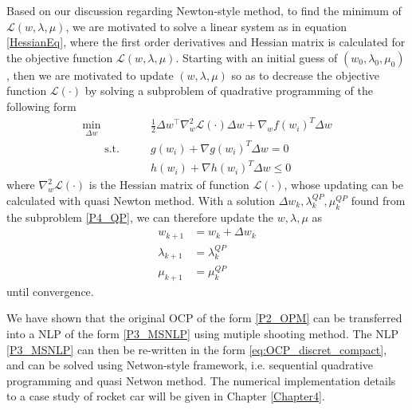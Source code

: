 \documentclass  [
  paper    = a4,
  BCOR     = 10mm,
  twoside,
  fontsize = 12pt,
  fleqn,
  toc      = bibnumbered,
  toc      = listofnumbered,
  numbers  = noendperiod,
  headings = normal,
  listof   = leveldown,
  version  = 3.03
]                                       {scrreprt}
\newcommand{\<}{\langle}
\renewcommand{\>}{\rangle}
\begin{document}
Based on our discussion regarding Newton-style method, to find the minimum of $	\mathcal{L}(w,\lambda, \mu) $, we are motivated to solve a linear system as in equation \ref{HessianEq}, where the first order derivatives and Hessian matrix is calculated for the objective function $\mathcal{L}(w,\lambda, \mu)$. Starting with an initial guess of $(w_0, \lambda_0, \mu_0)$, then we are motivated to update  $(w,\lambda, \mu)$ so as to decrease the objective function $\mathcal{L}(\cdot)$ by solving a subproblem of quadrative programming of the following form
\begin{subequations}
	\label{eq:ocp_QP}
	\begin{align}
		\underset{\Delta w }{\text{min}} \qquad & \frac{1}{2} \Delta w^\top \nabla^2_w \mathcal{L}(\cdot)\Delta w +\nabla_w f(w_i)^T \Delta w	\\
		\qquad \text{s.t.}\qquad	& g(w_i) + \nabla g(w_i)^T \Delta w = 0 \\
		& h(w_i) + \nabla h(w_i)^T \Delta w \leq 0
	\end{align}
    \label{P4_QP}
\end{subequations}
where $\nabla^2_w \mathcal{L}(\cdot)$ is the Hessian matrix of function $\mathcal{L}(\cdot)$, whose updating can be calculated with quasi Newton method. With a solution $\Delta w_k, \lambda_k^{QP}, \mu_k^{QP}$ found from the subproblem \ref{P4_QP}, we can therefore update the $w, \lambda, \mu$ as 
\begin{subequations}
	\begin{align}
		w_{k+1} &= w_k + \Delta w_k \\
		\lambda_{k+1} &= \lambda_k^{QP} \\ 
		\mu_{k+1}&= \mu_k^{QP} 
			\end{align}
\end{subequations}
until convergence. 

We have shown that the original OCP of the form \ref{P2_OPM} can be transferred into a NLP of the form \ref{P3_MSNLP} using mutiple shooting method. The NLP \ref{P3_MSNLP} can then be re-written in the form  \ref{eq:OCP_discret_compact}, and can be solved using Netwon-style framework, i.e. sequential quadrative programming and quasi Netwon method. The  numerical implementation details to a case study of rocket car will be given in Chapter \ref{Chapter4}.
		
\end{document}

